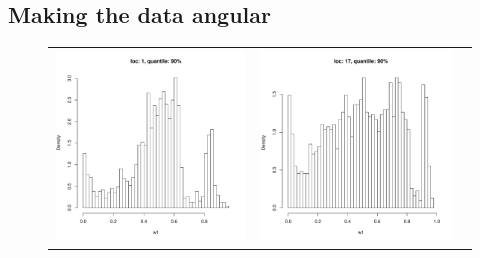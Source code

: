 \documentclass[10pt]{report}
\begin{document}
\subsection{Making the data angular}

\begin{figure}[h]
\begin{tabular}{ccc}
\includegraphics[width=\textwidth/3]{../img/loc1/quantile90/histogram.pdf}
&
\includegraphics[width=\textwidth/3]{../img/loc17/quantile90/histogram.pdf}

\end{tabular}
\end{figure}
\end{document}
